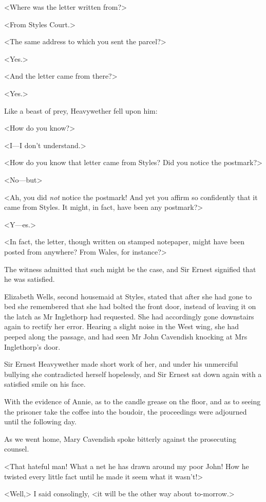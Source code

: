  <Where was the letter written from?> 

 <From Styles Court.> 

 <The same address to which you sent the parcel?> 

 <Yes.> 

 <And the letter came from there?> 

 <Yes.> 

 Like a beast of prey, Heavywether fell upon him: 

 <How do you know?> 

 <I—I don't understand.> 

 <How do you know that letter came from Styles? Did you notice the postmark?> 

 <No—but\longdash> 

 <Ah, you did \emph{not} notice the postmark! And yet you affirm so confidently that it came from Styles. It might, in fact, have been any postmark?> 

 <Y—es.> 

 <In fact, the letter, though written on stamped notepaper, might have been posted from anywhere? From Wales, for instance?> 

 The witness admitted that such might be the case, and Sir Ernest signified that he was satisfied. 

 Elizabeth Wells, second housemaid at Styles, stated that after she had gone to bed she remembered that she had bolted the front door, instead of leaving it on the latch as Mr Inglethorp had requested. She had accordingly gone downstairs again to rectify her error. Hearing a slight noise in the West wing, she had peeped along the passage, and had seen Mr John Cavendish knocking at Mrs Inglethorp's door. 

 Sir Ernest Heavywether made short work of her, and under his unmerciful bullying she contradicted herself hopelessly, and Sir Ernest sat down again with a satisfied smile on his face. 

 With the evidence of Annie, as to the candle grease on the floor, and as to seeing the prisoner take the coffee into the boudoir, the proceedings were adjourned until the following day. 

 As we went home, Mary Cavendish spoke bitterly against the prosecuting counsel. 

 <That hateful man! What a net he has drawn around my poor John! How he twisted every little fact until he made it seem what it wasn't!> 

 <Well,> I said consolingly, <it will be the other way about to-morrow.> 

